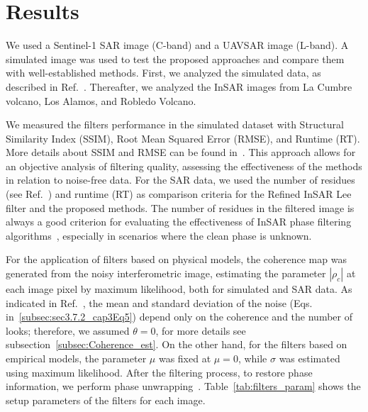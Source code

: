 \documentclass[remotesensing,article,submit,pdftex,moreauthors]{Definitions/mdpi}
\begin{document}
\section{Results}\label{sec:resu}

We used a Sentinel-1 SAR image (C-band) and a UAVSAR image (L-band). A simulated image was used to test the proposed approaches and compare them with well-established methods. First, we analyzed the simulated data, as described in Ref.~\cite{InSAR-MONet2022}. 
Thereafter, we analyzed the InSAR images from La Cumbre volcano, Los Alamos, and Robledo Volcano.

We measured the filters performance in the simulated dataset with Structural Similarity Index (SSIM), Root Mean Squared Error (RMSE), and Runtime (RT). 
More details about SSIM and RMSE can be found in~\cite{wbss_ssim, hastie2009elements}. 
This approach allows for an objective analysis of filtering quality, assessing the effectiveness of the methods in relation to noise-free data. 
For the SAR data, we used the number of residues (see Ref.~\cite{RS_Golg_zeb_wer}) and runtime (RT) as comparison criteria for the Refined InSAR Lee filter and the proposed methods.
The number of residues in the filtered image is always a good criterion for evaluating the effectiveness of InSAR phase filtering algorithms~\cite{EnhancedInterferometricPhaseNoiseFilteringoftheRefinedInSARFilter}, especially in scenarios where the clean phase is unknown.

For the application of filters based on physical models, the coherence map was generated from the noisy interferometric image, estimating the parameter $|\rho_c|$ at each image pixel by maximum likelihood, both for simulated and SAR data. 
As indicated in Ref.~\cite{RefinedFilteringofInterferometricPhaseFromInSARData}, the mean and standard deviation of the noise (Eqs. in~\eqref{subsec:sec3.7.2_cap3Eq5}) depend only on the coherence and the number of looks; therefore, we assumed $\theta = 0$, for more details see subsection~\ref{subsec:Coherence_est}. 
On the other hand, for the filters based on empirical models, the parameter $\mu$ was fixed at $\mu = 0$, while $\sigma$ was estimated using maximum likelihood.
After the filtering process, to restore phase information, we perform phase unwrapping~\cite{Fasttwodimensionalphaseunwrappingalgorithm}. 
Table~\ref{tab:filters_param} shows the setup parameters of the filters for each image. 
\end{document}
